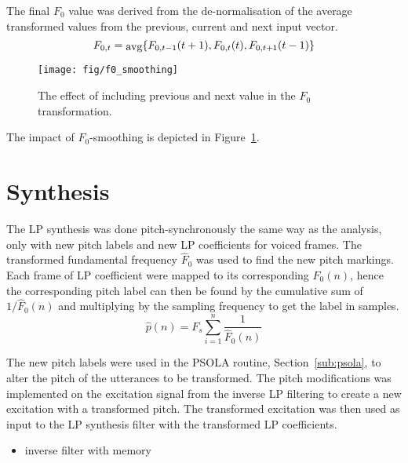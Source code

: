 The final $F_0$ value was derived from the de-normalisation of the average transformed values from the previous, current and next input vector.
\begin{equation}
	F_{0,t} = \txt{avg}\cbrackets{F_{0,t-1}(t+1),F_{0,t}(t),F_{0,t+1}(t-1)} 
\end{equation}
\begin{figure}[htbp]
	\begin{center}
		\texttt{[image: fig/f0\_smoothing]}
		\caption{The effect of including previous and next value in the $F_0$ transformation.}
		\label{fig:f0_smoothing}
	\end{center}
\end{figure}
The impact of $F_0$-smoothing is depicted in Figure~\ref{fig:f0_smoothing}.


\section{Synthesis} %
\label{sec:synthesis2}

The LP synthesis was done pitch-synchronously the same way as the analysis, only with new pitch labels and new LP coefficients for voiced frames. The transformed fundamental frequency $\hat{F}_0$ was used to find the new pitch markings. Each frame of LP coefficient were mapped to its corresponding $F_0(n)$, hence the corresponding pitch label can then be found by the cumulative sum of $1/\hat{F}_0(n)$ and multiplying by the sampling frequency to get the label in samples.
\begin{equation}
	\hat{p}(n) = F_s \sum_{i=1}^{n}\frac{1}{\hat{F}_0(n)}
\end{equation}

The new pitch labels were used in the PSOLA routine, Section~\ref{sub:psola},
 to alter the pitch of the utterances to be transformed. The pitch modifications was implemented on the excitation signal from the inverse LP filtering to create a new excitation with a transformed pitch. The transformed excitation was then used as input to the LP synthesis filter with the transformed LP coefficients. 

\begin{itemize}
	\item inverse filter with memory
\end{itemize}


